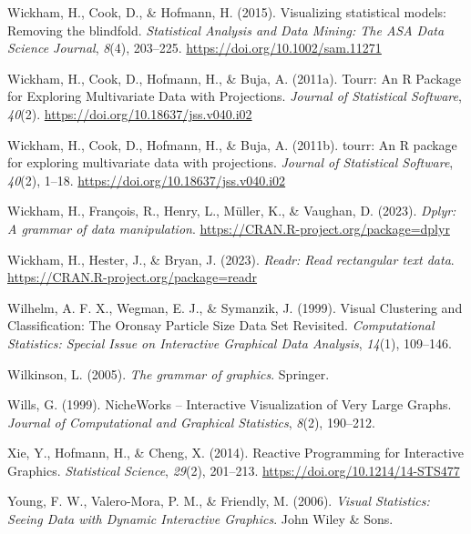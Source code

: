 \documentclass[
  letterpaper,
]{krantz}
\newlength{\cslhangindent}
\newlength{\cslentryspacingunit} %
\newenvironment{CSLReferences}[2] %
 {%
  \setlength{\parindent}{0pt}
  \ifodd #1
  \let\oldpar\par
  \def\par{\hangindent=\cslhangindent\oldpar}
  \fi
  \setlength{\parskip}{#2\cslentryspacingunit}
 }%
 {}
\begin{document}
\begin{CSLReferences}{1}{0}
\leavevmode{}%
Wickham, H., Cook, D., \& Hofmann, H. (2015). Visualizing statistical
models: Removing the blindfold. \emph{Statistical Analysis and Data
Mining: The ASA Data Science Journal}, \emph{8}(4), 203--225.
\url{https://doi.org/10.1002/sam.11271}

\leavevmode{}%
Wickham, H., Cook, D., Hofmann, H., \& Buja, A. (2011a). Tourr: {An} {R}
{Package} for {Exploring} {Multivariate} {Data} with {Projections}.
\emph{Journal of Statistical Software}, \emph{40}(2).
\url{https://doi.org/10.18637/jss.v040.i02}

\leavevmode{}%
Wickham, H., Cook, D., Hofmann, H., \& Buja, A. (2011b). {tourr}: An {R}
package for exploring multivariate data with projections. \emph{Journal
of Statistical Software}, \emph{40}(2), 1--18.
\url{https://doi.org/10.18637/jss.v040.i02}

\leavevmode{}%
Wickham, H., François, R., Henry, L., Müller, K., \& Vaughan, D. (2023).
\emph{Dplyr: A grammar of data manipulation}.
\url{https://CRAN.R-project.org/package=dplyr}

\leavevmode{}%
Wickham, H., Hester, J., \& Bryan, J. (2023). \emph{Readr: Read
rectangular text data}. \url{https://CRAN.R-project.org/package=readr}

\leavevmode{}%
Wilhelm, A. F. X., Wegman, E. J., \& Symanzik, J. (1999). Visual
{C}lustering and {C}lassification: {T}he {O}ronsay {P}article {S}ize
{D}ata {S}et {R}evisited. \emph{Computational Statistics: Special Issue
on Interactive Graphical Data Analysis}, \emph{14}(1), 109--146.

\leavevmode{}%
Wilkinson, L. (2005). \emph{The grammar of graphics}. Springer.

\leavevmode{}%
Wills, G. (1999). NicheWorks -- {I}nteractive {V}isualization of {V}ery
{L}arge {G}raphs. \emph{Journal of Computational and Graphical
Statistics}, \emph{8}(2), 190--212.

\leavevmode{}%
Xie, Y., Hofmann, H., \& Cheng, X. (2014). {Reactive Programming for
Interactive Graphics}. \emph{Statistical Science}, \emph{29}(2),
201--213. \url{https://doi.org/10.1214/14-STS477}

\leavevmode{}%
Young, F. W., Valero-Mora, P. M., \& Friendly, M. (2006). \emph{Visual
{S}tatistics: {S}eeing {D}ata with {D}ynamic {I}nteractive {G}raphics}.
John Wiley \& Sons.


\end{CSLReferences}
\end{document}
